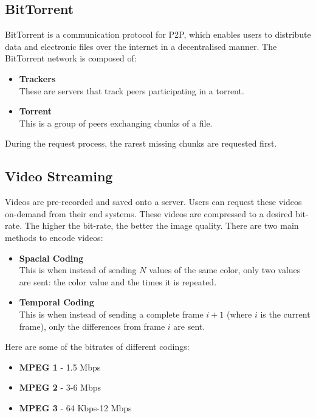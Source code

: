 \documentclass{article}
\begin{document}
\subsection{BitTorrent}
BitTorrent is a communication protocol for P2P, which enables users to distribute data and electronic files over the internet in a decentralised manner. The BitTorrent network is composed of:

\begin{itemize}
	\item \textbf{Trackers}
	\vspace{.2cm} \\
	These are servers that track peers participating in a torrent.
	
	\item \textbf{Torrent}
	\vspace{.2cm} \\
	This is a group of peers exchanging chunks of a file.
\end{itemize}
During the request process, the rarest missing chunks are requested first.

\subsection{Video Streaming}
Videos are pre-recorded and saved onto a server. Users can request these videos on-demand from their end systems. These videos are compressed to a desired bit-rate. The higher the bit-rate, the better the image quality. There are two main methods to encode videos:

\begin{itemize}
	\item \textbf{Spacial Coding}
	\vspace{.2cm} \\
	This is when instead of sending $N$ values of the same color, only two values are sent: the color value and the times it is repeated.
	
	\item \textbf{Temporal Coding}
	\vspace{.2cm} \\
	This is when instead of sending a complete frame $i+1$ (where $i$ is the current frame), only the differences from frame $i$ are sent.
\end{itemize}

Here are some of the bitrates of different codings:

\begin{itemize}
	\item \textbf{MPEG 1} - 1.5 Mbps
	\item \textbf{MPEG 2} - 3-6 Mbps
	\item \textbf{MPEG 3} - 64 Kbps-12 Mbps
\end{itemize}
\end{document}
